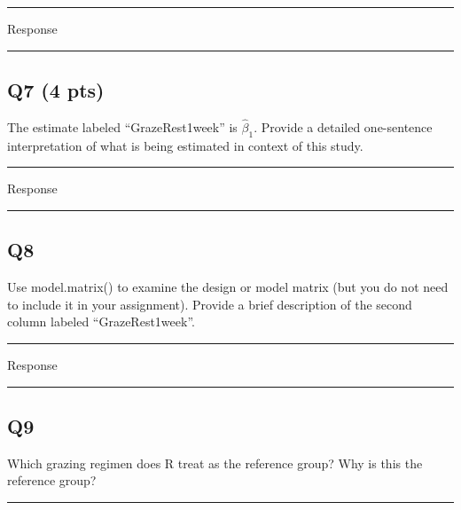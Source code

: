 \documentclass[
]{article}
\begin{document}
\begin{center}\rule{0.5\linewidth}{0.5pt}\end{center}

Response

\begin{center}\rule{0.5\linewidth}{0.5pt}\end{center}

\hypertarget{q7-4-pts}{%
\subsection{Q7 (4 pts)}\label{q7-4-pts}}

The estimate labeled ``GrazeRest1week'' is \(\hat\beta_1\). Provide a
detailed one-sentence interpretation of what is being estimated in
context of this study.

\begin{center}\rule{0.5\linewidth}{0.5pt}\end{center}

Response

\begin{center}\rule{0.5\linewidth}{0.5pt}\end{center}

\hypertarget{q8}{%
\subsection{Q8}\label{q8}}

Use model.matrix() to examine the design or model matrix (but you do not
need to include it in your assignment). Provide a brief description of
the second column labeled ``GrazeRest1week''.

\begin{center}\rule{0.5\linewidth}{0.5pt}\end{center}

Response

\begin{center}\rule{0.5\linewidth}{0.5pt}\end{center}

\hypertarget{q9}{%
\subsection{Q9}\label{q9}}

Which grazing regimen does R treat as the reference group? Why is this
the reference group?

\begin{center}\rule{0.5\linewidth}{0.5pt}\end{center}
\end{document}
